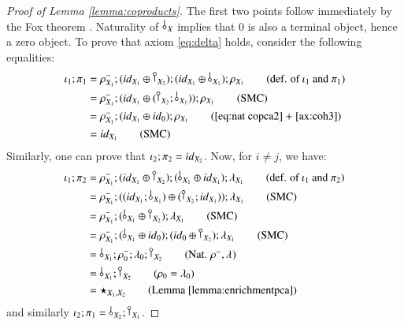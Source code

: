 \begin{proof}[Proof of Lemma \ref{lemma:coproducts}]
The first two points follow immediately by the Fox theorem \cite{fox1976coalgebras}. Naturality of $\,\bangp{X}$ implies that $0$ is also a terminal object, hence a zero object. 
  To prove that axiom \eqref{eq:delta} holds, consider the following equalities:
    \begin{align}
        \iota_1;\pi_1 & = \Irunit{X_1};(\id{X_1}\oplus \cobang{X_2});(\id{X_1}\oplus \bang{X_1});\runit{X_1} \tag{def. of $\iota_1$ and $\pi_1$}\\
        & = \Irunit{X_1};(\id{X_1}\oplus (\cobang{X_2};\bang{X_1}));\runit{X_1} \tag{SMC}\\
        & = \Irunit{X_1};(\id{X_1}\oplus \id{0});\runit{X_1} \tag{\ref{eq:nat copca2} + \ref{ax:coh3}}\\
        & = \id{X_1} \tag{SMC}
    \end{align}
    Similarly, one can prove that $\iota_2;\pi_2 = {id}_{X_2}$. Now, for $i\neq j$, we have: 
    \begin{align}
        \iota_1;\pi_2 & = \Irunit{X_1};(\id{X_1}\oplus \cobang{X_2});(\bang{X_1}\oplus \id{X_1});\lunit{X_1} \tag{def. of $\iota_1$ and $\pi_2$}\\
        & = \Irunit{X_1};((\id{X_1};\bang{X_1})\oplus (\cobang{X_2};\id{X_1}));\lunit{X_1} \tag{SMC}\\
        & = \Irunit{X_1};(\bang{X_1}\oplus \cobang{X_2});\lunit{X_1} \tag{SMC}\\
        & = \Irunit{X_1};(\,\bangp{X_1}\oplus \id{0});(\id{0}\oplus \cobang{X_2});\lunit{X_1}\tag{SMC}\\  
        & = \bang{X_1};\Irunit{0};\lunit{0};\cobang{X_2}    \tag{Nat. $\Irunit{},\lunit{}$}     \\
        & = \bang{X_1};\cobang{X_2} \tag{$\runit{0}=\lunit{0}$} \\
        & =\star_{X_1,X_2} \tag{Lemma~\ref{lemma:enrichmentpca}}
    \end{align}
    and similarly $\iota_2;\pi_1 = \bang{X_2};\cobang{X_1}$.
\end{proof}

